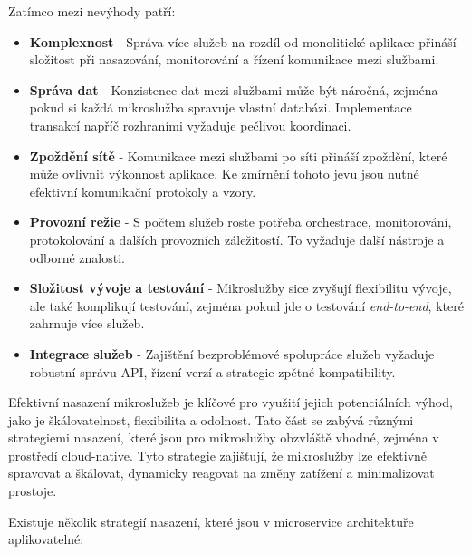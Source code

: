Zatímco mezi nevýhody patří:

\begin{itemize}

\item \textbf{Komplexnost} - Správa více služeb na rozdíl od monolitické aplikace přináší složitost při nasazování, monitorování a řízení komunikace mezi službami.

\item \textbf{Správa dat} - Konzistence dat mezi službami může být náročná, zejména pokud si každá mikroslužba spravuje vlastní databázi. Implementace transakcí napříč rozhraními vyžaduje pečlivou koordinaci.

\item \textbf{Zpoždění sítě} - Komunikace mezi službami po síti přináší zpoždění, které může ovlivnit výkonnost aplikace. Ke zmírnění tohoto jevu jsou nutné efektivní komunikační protokoly a vzory.

\item \textbf{Provozní režie} - S počtem služeb roste potřeba orchestrace, monitorování, protokolování a dalších provozních záležitostí. To vyžaduje další nástroje a odborné znalosti.

\item \textbf{Složitost vývoje a testování} - Mikroslužby sice zvyšují flexibilitu vývoje, ale také komplikují testování, zejména pokud jde o testování \emph{end-to-end}, které zahrnuje více služeb.

\item \textbf{Integrace služeb} - Zajištění bezproblémové spolupráce služeb vyžaduje robustní správu API, řízení verzí a strategie zpětné kompatibility.

\end{itemize}


Efektivní nasazení mikroslužeb je klíčové pro využití jejich potenciálních výhod, jako je škálovatelnost, flexibilita a odolnost. Tato část se zabývá různými strategiemi nasazení, které jsou pro mikroslužby obzvláště vhodné, zejména v prostředí cloud-native. Tyto strategie zajišťují, že mikroslužby lze efektivně spravovat a škálovat, dynamicky reagovat na změny zatížení a minimalizovat prostoje.


Existuje několik strategií nasazení, které jsou v microservice architektuře aplikovatelné:

